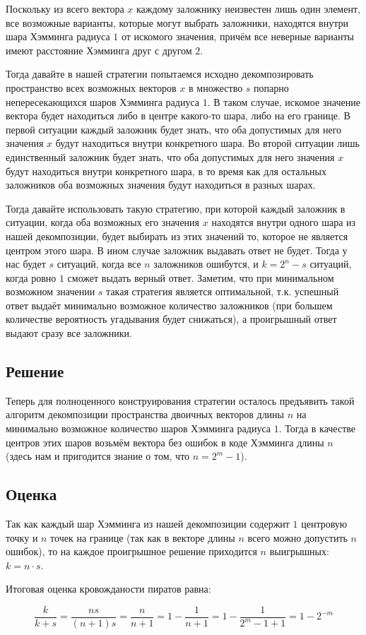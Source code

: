\documentclass[fontsize=14pt]{article}
\begin{document}
Поскольку из всего вектора $x$ каждому заложнику неизвестен лишь один элемент, все возможные варианты, которые могут выбрать заложники, находятся внутри шара Хэмминга радиуса $1$ от искомого значения, причём все неверные варианты имеют расстояние Хэмминга друг с другом $2$.

Тогда давайте в нашей стратегии попытаемся исходно декомпозировать пространство всех возможных векторов $x$ в множество $s$ попарно непересекающихся шаров Хэмминга радиуса $1$. В таком случае, искомое значение вектора будет находиться либо в центре какого-то шара, либо на его границе. В первой ситуации каждый заложник будет знать, что оба допустимых для него значения $x$ будут находиться внутри конкретного шара. Во второй ситуации лишь единственный заложник будет знать, что оба допустимых для него значения $x$ будут находиться внутри конкретного шара, в то время как для остальных заложников оба возможных значения будут находиться в разных шарах.

Тогда давайте использовать такую стратегию, при которой каждый заложник в ситуации, когда оба возможных его значения $x$ находятся внутри одного шара из нашей декомпозиции, будет выбирать из этих значений то, которое не является центром этого шара. В ином случае заложник выдавать ответ не будет. Тогда у нас будет $s$ ситуаций, когда все $n$ заложников ошибутся, и $k = 2^n - s$ ситуаций, когда ровно $1$ сможет выдать верный ответ. Заметим, что при минимальном возможном значении $s$ такая стратегия является оптимальной, т.к. успешный ответ выдаёт минимально возможное количество заложников (при большем количестве вероятность угадывания будет снижаться), а проигрышный ответ выдают сразу все заложники.

\subsection*{Решение}

Теперь для полноценного конструирования стратегии осталось предъявить такой алгоритм декомпозиции пространства двоичных векторов длины $n$ на минимально возможное количество шаров Хэмминга радиуса $1$. Тогда в качестве центров этих шаров возьмём вектора без ошибок в коде Хэмминга длины $n$ (здесь нам и пригодится знание о том, что $n = 2^m - 1$).

\subsection*{Оценка}

Так как каждый шар Хэмминга из нашей декомпозиции содержит $1$ центровую точку и $n$ точек на границе (так как в векторе длины $n$ всего можно допустить $n$ ошибок), то на каждое проигрышное решение приходится $n$ выигрышных: $k = n \cdot s$.

Итоговая оценка кровожданости пиратов равна:

$$\frac{k}{k + s} = \frac{n s}{(n + 1) s} = \frac{n}{n + 1} = 1 - \frac{1}{n + 1} = 1 - \frac{1}{2^m - 1 + 1} = 1 - 2^{-m}$$
\end{document}
